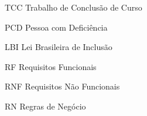 
\listoffigures*
\cleardoublepage



\listoftables*
\cleardoublepage

\begin{siglas}
	\item[TCC] Trabalho de Conclusão de Curso
	\item[PCD] Pessoa com Deficiência
	\item[LBI] Lei Brasileira de Inclusão
	\item[RF] Requisitos Funcionais
	\item[RNF] Requisitos Não Funcionais
	\item[RN] Regras de Negócio 
\end{siglas}
